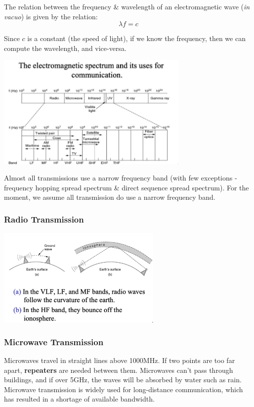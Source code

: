 \documentclass[11pt]{article}
\begin{document}
The relation between the frequency \& wavelength of an electromagnetic wave (\textit{in vacuo}) is given by the relation:
$$ \lambda f = c $$

Since $c$ is a constant (the speed of light), if we know the frequency, then we can compute the wavelength, and vice-versa. 

\begin{center}
    \includegraphics[width=0.7\textwidth]{electrospec.png}
\end{center}

Almost all transmissions use a narrow frequency band (with few exceptions - frequency hopping spread spectrum \& direct sequence spread 
spectrum). 
For the moment, we assume all transmission do use a narrow frequency band. 

\subsubsection{Radio Transmission}
\begin{center}
    \includegraphics[width=0.6\textwidth]{radiotrans.png}
\end{center}

\subsubsection{Microwave Transmission}
Microwaves travel in straight lines above 1000MHz. 
If two points are too far apart, \textbf{repeaters} are needed between them. 
Microwaves can't pass through buildings, and if over 5GHz, the waves will be absorbed by water such as rain. 
Microwave transmission is widely used for long-distance communication, which has resulted in a shortage of available bandwidth. 
\end{document}
